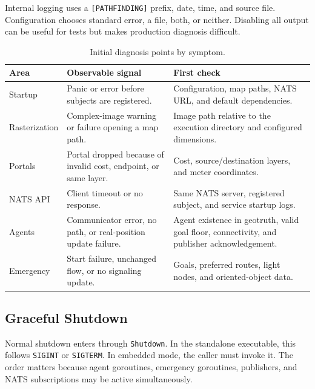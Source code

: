 \documentclass[12pt,a4paper]{report}
\begin{document}
Internal logging uses a \texttt{[PATHFINDING]} prefix, date, time, and source
file. Configuration chooses standard error, a file, both, or neither. Disabling
all output can be useful for tests but makes production diagnosis difficult.

\begin{table}[H]
\centering
\begin{tabular}{|p{}|p{}|p{}|}
\hline
\textbf{Area} & \textbf{Observable signal} & \textbf{First check} \\
\hline
Startup &
Panic or error before subjects are registered. &
Configuration, map paths, NATS URL, and default dependencies. \\
\hline
Rasterization &
Complex-image warning or failure opening a map path. &
Image path relative to the execution directory and configured dimensions. \\
\hline
Portals &
Portal dropped because of invalid cost, endpoint, or same layer. &
Cost, source/destination layers, and meter coordinates. \\
\hline
NATS API &
Client timeout or no response. &
Same NATS server, registered subject, and service startup logs. \\
\hline
Agents &
Communicator error, no path, or real-position update failure. &
Agent existence in geotruth, valid goal floor, connectivity, and publisher
acknowledgement. \\
\hline
Emergency &
Start failure, unchanged flow, or no signaling update. &
Goals, preferred routes, light nodes, and oriented-object data. \\
\hline
\end{tabular}
\caption{Initial diagnosis points by symptom.}
\end{table}

\subsection{Graceful Shutdown}

Normal shutdown enters through \texttt{Shutdown}. In the standalone executable,
this follows \texttt{SIGINT} or \texttt{SIGTERM}. In embedded mode, the caller
must invoke it. The order matters because agent goroutines, emergency
goroutines, publishers, and NATS subscriptions may be active simultaneously.
\end{document}
